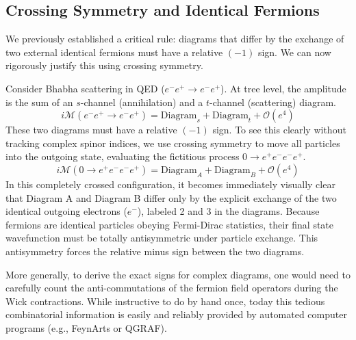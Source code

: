 \subsection{Crossing Symmetry and Identical Fermions}

We previously established a critical rule: diagrams that differ by the exchange of two external identical fermions must have a relative $(-1)$ sign. We can now rigorously justify this using crossing symmetry.

Consider Bhabha scattering in QED ($e^- e^+ \to e^- e^+$). At tree level, the amplitude is the sum of an $s$-channel (annihilation) and a $t$-channel (scattering) diagram.
\[
    i\mathcal{M}(e^- e^+ \to e^- e^+) = \text{Diagram}_s + \text{Diagram}_t + \mathcal{O}(e^4)
\]
These two diagrams must have a relative $(-1)$ sign. To see this clearly without tracking complex spinor indices, we use crossing symmetry to move all particles into the outgoing state, evaluating the fictitious process $0 \to e^+ e^- e^- e^+$.
\[
    i\mathcal{M}(0 \to e^+ e^- e^- e^+) = \text{Diagram}_A + \text{Diagram}_B + \mathcal{O}(e^4)
\]
In this completely crossed configuration, it becomes immediately visually clear that Diagram A and Diagram B differ only by the explicit exchange of the two identical outgoing electrons ($e^-$), labeled 2 and 3 in the diagrams. Because fermions are identical particles obeying Fermi-Dirac statistics, their final state wavefunction must be totally antisymmetric under particle exchange. This antisymmetry forces the relative minus sign between the two diagrams.

\begin{remark}
    More generally, to derive the exact signs for complex diagrams, one would need to carefully count the anti-commutations of the fermion field operators during the Wick contractions. While instructive to do by hand once, today this tedious combinatorial information is easily and reliably provided by automated computer programs (e.g., FeynArts or QGRAF).
\end{remark}